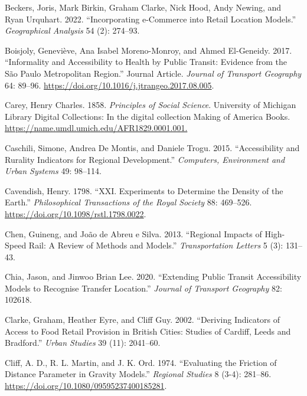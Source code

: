 \documentclass[
]{article}
\newlength{\cslhangindent}
\newenvironment{CSLReferences}[2] %
 {\begin{list}{}{%
  \setlength{\itemindent}{0pt}
  \setlength{\leftmargin}{0pt}
  \setlength{\parsep}{0pt}
  \ifodd #1
   \setlength{\leftmargin}{\cslhangindent}
   \setlength{\itemindent}{-1\cslhangindent}
  \fi
  \setlength{\itemsep}{#2\baselineskip}}}
 {\end{list}}
\begin{document}
\begin{CSLReferences}{1}{0}
Beckers, Joris, Mark Birkin, Graham Clarke, Nick Hood, Andy Newing, and
Ryan Urquhart. 2022. {``Incorporating e-Commerce into Retail Location
Models.''} \emph{Geographical Analysis} 54 (2): 274--93.

Boisjoly, Geneviève, Ana Isabel Moreno-Monroy, and Ahmed El-Geneidy.
2017. {``Informality and Accessibility to Health by Public Transit:
Evidence from the São Paulo Metropolitan Region.''} Journal Article.
\emph{Journal of Transport Geography} 64: 89--96.
\url{https://doi.org/10.1016/j.jtrangeo.2017.08.005}.

Carey, Henry Charles. 1858. \emph{Principles of Social Science}.
University of Michigan Library Digital Collections: In the digital
collection Making of America Books.
\url{https://name.umdl.umich.edu/AFR1829.0001.001.}

Caschili, Simone, Andrea De Montis, and Daniele Trogu. 2015.
{``Accessibility and Rurality Indicators for Regional Development.''}
\emph{Computers, Environment and Urban Systems} 49: 98--114.

Cavendish, Henry. 1798. {``{XXI}. {Experiments} to Determine the Density
of the Earth.''} \emph{Philosophical Transactions of the Royal Society}
88: 469--526. \url{https://doi.org/10.1098/rstl.1798.0022}.

Chen, Guineng, and João de Abreu e Silva. 2013. {``Regional Impacts of
High-Speed Rail: A Review of Methods and Models.''} \emph{Transportation
Letters} 5 (3): 131--43.

Chia, Jason, and Jinwoo Brian Lee. 2020. {``Extending Public Transit
Accessibility Models to Recognise Transfer Location.''} \emph{Journal of
Transport Geography} 82: 102618.

Clarke, Graham, Heather Eyre, and Cliff Guy. 2002. {``Deriving
Indicators of Access to Food Retail Provision in British Cities: Studies
of Cardiff, Leeds and Bradford.''} \emph{Urban Studies} 39 (11):
2041--60.

Cliff, A. D., R. L. Martin, and J. K. Ord. 1974. {``Evaluating the
Friction of Distance Parameter in Gravity Models.''} \emph{Regional
Studies} 8 (3-4): 281--86.
\url{https://doi.org/10.1080/09595237400185281}.


\end{CSLReferences}
\end{document}

